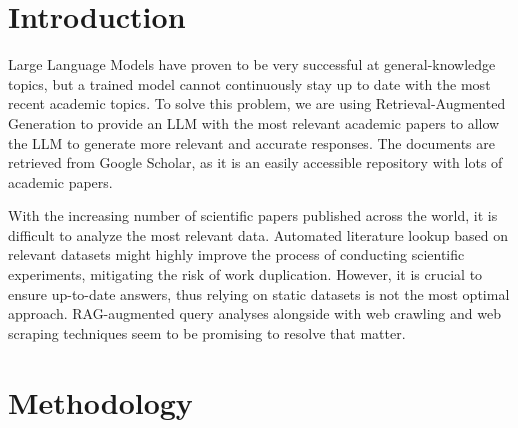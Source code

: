 \documentclass[fleqn,moreauthors,10pt]{ds_report}
\affiliation{\textit{Advisors: Aleš Žagar}}
\begin{document}
\flushbottom 

\maketitle 

\thispagestyle{empty} 


\section*{Introduction}
	Large Language Models have proven to be very successful at general-knowledge topics, but a trained model cannot continuously stay up to date with the most recent academic topics. To solve this problem, we are using Retrieval-Augmented Generation to provide an LLM with the most relevant academic papers to allow the LLM to generate more relevant and accurate responses. The documents are retrieved from Google Scholar, as it is an easily accessible repository with lots of academic papers.
	
	With the increasing number of scientific papers published across the world, it is difficult to analyze the most relevant data. Automated literature lookup based on relevant datasets might highly improve the process of conducting scientific experiments, mitigating the risk of work duplication. However, it is crucial to ensure up-to-date answers, thus relying on static datasets is not the most optimal approach. RAG-augmented query analyses alongside with web crawling and web scraping techniques seem to be promising to resolve that matter.



\section*{Methodology}
\end{document}
